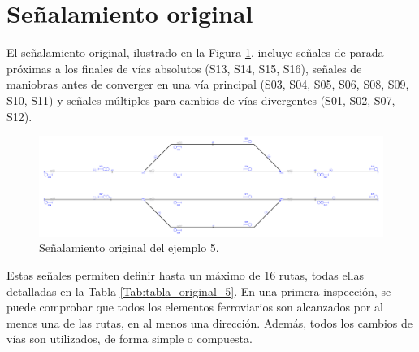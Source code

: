 \section{Señalamiento original}

    El señalamiento original, ilustrado en la Figura \ref{fig:EJ5_2}, incluye señales de parada próximas a los finales de vías absolutos (S13, S14, S15, S16), señales de maniobras antes de converger en una vía principal (S03, S04, S05, S06, S08, S09, S10, S11) y señales múltiples para cambios de vías divergentes (S01, S02, S07, S12).
    
    \begin{figure}[H]
    	\centering
    	\includegraphics[width=1\textwidth]{resultados-obtenidos/ejemplo5/images/5_original.png}
    	\centering\caption{Señalamiento original del ejemplo 5.}
    	\label{fig:EJ5_2}
    \end{figure}
    
    Estas señales permiten definir hasta un máximo de 16 rutas, todas ellas detalladas en la Tabla \ref{Tab:tabla_original_5}. En una primera inspección, se puede comprobar que todos los elementos ferroviarios son alcanzados por al menos una de las rutas, en al menos una dirección. Además, todos los cambios de vías son utilizados, de forma simple o compuesta. 
    
